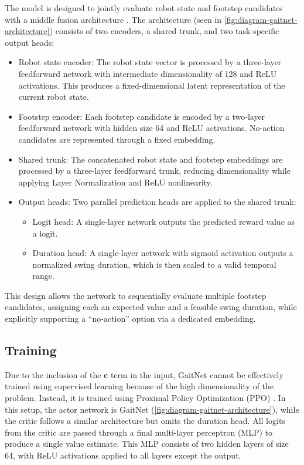 The model is designed to jointly evaluate robot state and footstep
candidates with a middle fusion architecture \cite{feng2021deep}. The
architecture (seen in \autoref{fig:diagram-gaitnet-architecture})
consists of two encoders, a shared trunk, and two task-specific output heads:

\begin{itemize}
  \item Robot state encoder: The robot state vector is processed by a
    three-layer feedforward network with intermediate dimensionality
    of 128 and ReLU activations. This produces a fixed-dimensional
    latent representation of the current robot state.
  \item Footstep encoder: Each footstep candidate is encoded by a
    two-layer feedforward network with hidden size 64 and ReLU
    activations. No-action candidates are represented through a fixed embedding.
  \item Shared trunk: The concatenated robot state and footstep
    embeddings are processed by a three-layer feedforward trunk,
    reducing dimensionality while applying Layer Normalization and
    ReLU nonlinearity.
  \item Output heads: Two parallel prediction heads are applied to
    the shared trunk:
    \begin{itemize}
      \item Logit head: A single-layer network outputs the predicted
        reward value as a logit.
      \item Duration head: A single-layer network with sigmoid
        activation outputs a normalized swing duration, which is then
        scaled to a valid temporal range.
    \end{itemize}
\end{itemize}

This design allows the network to sequentially evaluate multiple
footstep candidates, assigning each an expected value and a feasible
swing duration, while explicitly supporting a “no-action” option via
a dedicated embedding.

\subsection{Training}
\label{subsec:contactnet-training}

Due to the inclusion of the $\mathbf{c}$ term in the input, GaitNet
cannot be effectively trained using supervised learning because of
the high dimensionality of the problem. Instead, it is trained using
Proximal Policy Optimization (PPO) \cite{Schulman_proximal_2017}. In
this setup, the actor network is GaitNet
(\autoref{fig:diagram-gaitnet-architecture}), while the critic
follows a similar architecture but omits the duration head. All
logits from the critic are passed through a final multi-layer
perceptron (MLP) to produce a single value estimate. This MLP
consists of two hidden layers of size 64, with ReLU activations
applied to all layers except the output.


